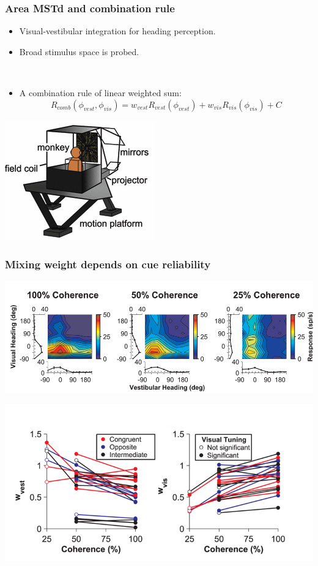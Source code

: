 \documentclass{beamer}
\begin{document}
\begin{frame}
  \frametitle{Area MSTd and combination rule}
  \begin{itemize}
    \item Visual-vestibular integration for heading perception.
    \item Broad stimulus space is probed.

    ~
    \item A combination rule of  linear weighted sum:
\begin{equation}
  R_{comb}(\phi_{vest}, \phi_{vis}) = w_{vest} R_{vest}(\phi_{vest}) + w_{vis} R_{vis}(\phi_{vis}) + C 
  \label{eq:lincomb}
\end{equation}
  \end{itemize}
  \begin{center}
    \includegraphics[scale=.4]{apparatus}
  \end{center}
\end{frame}

\begin{frame}
  \frametitle{Mixing weight depends on cue reliability}
  \begin{center}
    \includegraphics[width=\textwidth]{coherence}

    \includegraphics[width=.7\textwidth]{weight}
  \end{center}
\end{frame}
\end{document}
